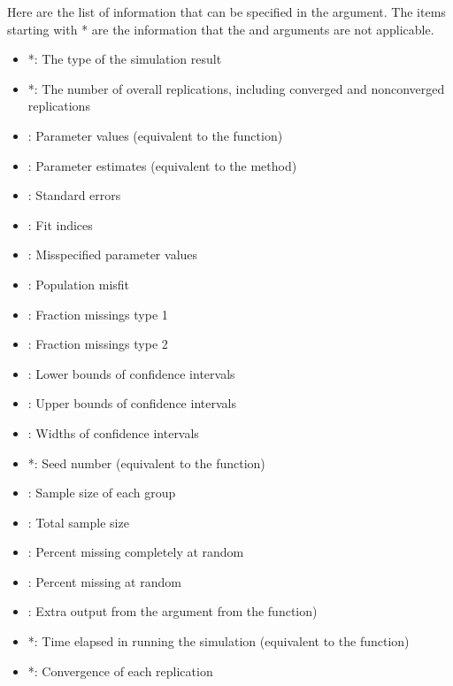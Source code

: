 \documentclass[a4paper]{book}
\begin{document}
\begin{Details}\relax
Here are the list of information that can be specified in the  argument. The items starting with * are the information that the  and  arguments are not applicable.
\begin{itemize}

\item *: The type of the simulation result
\item *: The number of overall replications, including converged and nonconverged replications
\item {}: Parameter values (equivalent to the  function)
\item {}: Parameter estimates (equivalent to the  method)
\item {}: Standard errors
\item {}: Fit indices
\item {}: Misspecified parameter values
\item {}: Population misfit
\item {}: Fraction missings type 1
\item {}: Fraction missings type 2
\item {}: Lower bounds of confidence intervals
\item {}: Upper bounds of confidence intervals
\item {}: Widths of confidence intervals
\item *: Seed number (equivalent to the  function)
\item {}: Sample size of each group
\item {}: Total sample size
\item {}: Percent missing completely at random
\item {}: Percent missing at random
\item {}: Extra output from the  argument from the  function)
\item *: Time elapsed in running the simulation (equivalent to the  function) 
\item *: Convergence of each replication

\end{itemize}

\end{Details}
\end{document}
